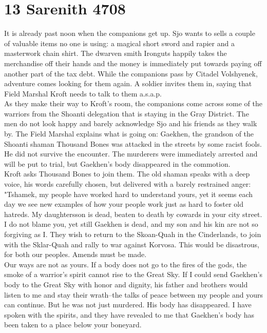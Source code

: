 \section{13 Sarenith 4708}

It is already past noon when the companions get up. Sjo wants to sells a couple of valuable items no one is using: a magical short sword and rapier and a masterwork chain shirt. The dwarven smith Ironguts happily takes the merchandise off their hands and the money is immediately put towards paying off another part of the tax debt. While the companions pass by Citadel Volshyenek, adventure comes looking for them again. A soldier invites them in, saying that Field Marshal Kroft needs to talk to them a.s.a.p.\\

As they make their way to Kroft's room, the companions come across some of the warriors from the Shoanti delegation that is staying in the Gray District. The men do not look happy and barely acknowledge Sjo and his friends as they walk by. The Field Marshal explains what is going on: Gaekhen, the grandson of the Shoanti shaman Thousand Bones was attacked in the streets by some racist fools. He did not survive the encounter. The murderers were immediately arrested and will be put to trial, but Gaekhen's body disappeared in the commotion.\\

Kroft asks Thousand Bones to join them. The old shaman speaks with a deep voice, his words carefully chosen, but delivered with a barely restrained anger: "Tshamek, my people have worked hard to understand yours, yet it seems each day we see new examples of how your people work just as hard to foster old hatreds. My daughtersson is dead, beaten to death by cowards in your city street. I do not blame you, yet still Gaekhen is dead, and my son and his kin are not so forgiving as I. They wish to return to the Skoan-Quah in the Cinderlands, to join with the Sklar-Quah and rally to war against Korvosa. This would be disastrous, for both our peoples. Amends must be made.\\

Our ways are not as yours. If a body does not go to the fires of the gods, the smoke of a warrior's spirit cannot rise to the Great Sky. If I could send Gaekhen's body to the Great Sky with honor and dignity, his father and brothers would listen to me and stay their wrath--the talks of peace between my people and yours can continue. But he was not just murdered. His body has disappeared. I have spoken with the spirits, and they have revealed to me that Gaekhen's body has been taken to a place below your boneyard.\\

